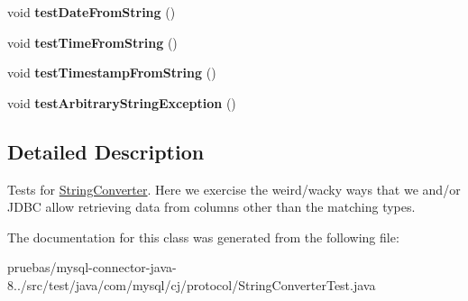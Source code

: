 \begin{DoxyCompactItemize}
void {\bfseries test\+Date\+From\+String} ()
\item 
\mbox{\label{classcom_1_1mysql_1_1cj_1_1protocol_1_1_string_converter_test_a89bfbcb5870477be9c6212bfffa51271}} 
void {\bfseries test\+Time\+From\+String} ()
\item 
\mbox{\label{classcom_1_1mysql_1_1cj_1_1protocol_1_1_string_converter_test_aeb3a67d004c1433654ec1e680d936169}} 
void {\bfseries test\+Timestamp\+From\+String} ()
\item 
\mbox{\label{classcom_1_1mysql_1_1cj_1_1protocol_1_1_string_converter_test_af6f4b8b4e0215d6332d00db515f8121a}} 
void {\bfseries test\+Arbitrary\+String\+Exception} ()
\end{DoxyCompactItemize}


\subsection{Detailed Description}
Tests for \mbox{\hyperlink{}{String\+Converter}}. Here we exercise the weird/wacky ways that we and/or J\+D\+BC allow retrieving data from columns other than the matching types. 

The documentation for this class was generated from the following file\+:\begin{DoxyCompactItemize}
\item 
pruebas/mysql-\/connector-\/java-\/8../src/test/java/com/mysql/cj/protocol/String\+Converter\+Test.\+java\end{DoxyCompactItemize}
